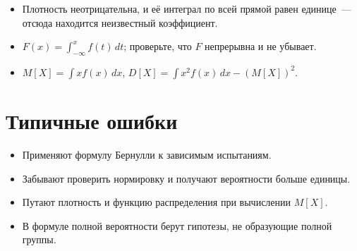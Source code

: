 \documentclass[12pt, a4paper]{article}
\begin{document}
\begin{itemize}[nosep]
  \item Плотность неотрицательна, и её интеграл по всей прямой равен единице~---
        отсюда находится неизвестный коэффициент.
  \item $F(x) = \int_{-\infty}^{x} f(t)\,dt$; проверьте, что $F$ непрерывна и не убывает.
  \item $M[X] = \int x f(x)\,dx$, \quad $D[X] = \int x^2 f(x)\,dx - (M[X])^2$.
\end{itemize}

\section*{Типичные ошибки}

\begin{itemize}[nosep]
  \item Применяют формулу Бернулли к зависимым испытаниям.
  \item Забывают проверить нормировку и получают вероятности больше единицы.
  \item Путают плотность и функцию распределения при вычислении $M[X]$.
  \item В формуле полной вероятности берут гипотезы, не образующие полной группы.
\end{itemize}
\end{document}
